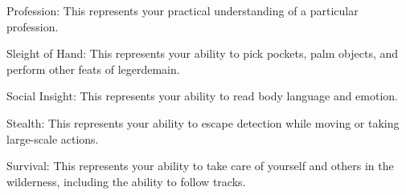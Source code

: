 \begin{raggeditemize}
    \item Profession: This represents your practical understanding of a particular profession.
    \item Sleight of Hand: This represents your ability to pick pockets, palm objects, and perform other feats of legerdemain.
    \item Social Insight: This represents your ability to read body language and emotion.
    \item Stealth: This represents your ability to escape detection while moving or taking large-scale actions.
    \item Survival: This represents your ability to take care of yourself and others in the wilderness, including the ability to follow tracks.
  \end{raggeditemize}
